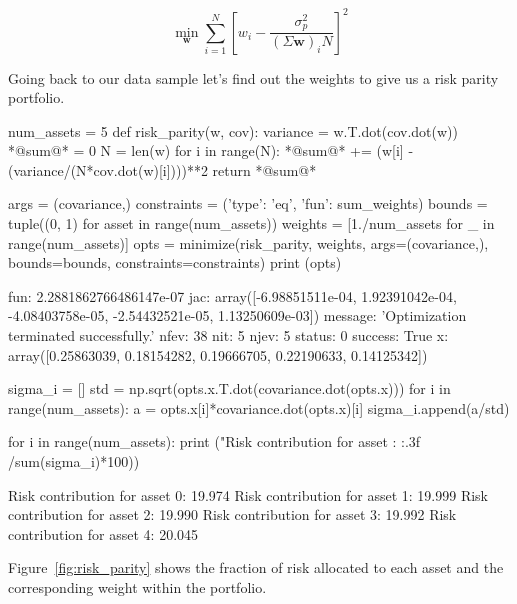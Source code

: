 \begin{equation} 
\underset{\mathbf{w}}{\min } \sum _{i=1}^{N}\left[w_{i}-{\frac {\sigma_p^{2}}{(\Sigma \mathbf{w})_{i}N}}\right]^{2} 
\end{equation}

Going back to our data sample let's find out the weights to give us a risk parity portfolio.

\begin{ipython}
num_assets = 5
def risk_parity(w, cov):
    variance = w.T.dot(cov.dot(w))
    *@sum@* = 0
    N = len(w)
    for i in range(N):
        *@sum@* += (w[i] - (variance/(N*cov.dot(w)[i])))**2
    return *@sum@*
	
args = (covariance,)
constraints = ({'type': 'eq', 'fun': sum_weights})
bounds = tuple((0, 1) for asset in range(num_assets))
weights = [1./num_assets for _ in range(num_assets)]
opts = minimize(risk_parity, weights, args=(covariance,),
                bounds=bounds, constraints=constraints)
print (opts)
\end{ipython}
\begin{ioutput}
    fun: 2.2881862766486147e-07
    jac: array([-6.98851511e-04,  1.92391042e-04, -4.08403758e-05, 
                -2.54432521e-05,  1.13250609e-03])
message: 'Optimization terminated successfully.'
   nfev: 38
    nit: 5
   njev: 5
 status: 0
success: True
x: array([0.25863039, 0.18154282, 0.19666705, 0.22190633, 
          0.14125342])
\end{ioutput}

\begin{ipython}
sigma_i = []
std = np.sqrt(opts.x.T.dot(covariance.dot(opts.x)))
for i in range(num_assets):
    a = opts.x[i]*covariance.dot(opts.x)[i]
	sigma_i.append(a/std)
	
for i in range(num_assets):
    print ("Risk contribution for asset {}: {:.3f}%
                                                            /sum(sigma_i)*100))
\end{ipython}
\begin{ioutput}
Risk contribution for asset 0: 19.974%
Risk contribution for asset 1: 19.999%
Risk contribution for asset 2: 19.990%
Risk contribution for asset 3: 19.992%
Risk contribution for asset 4: 20.045%
\end{ioutput}

Figure~\ref{fig:risk_parity} shows the fraction of risk allocated to each asset and the corresponding weight within the portfolio.

